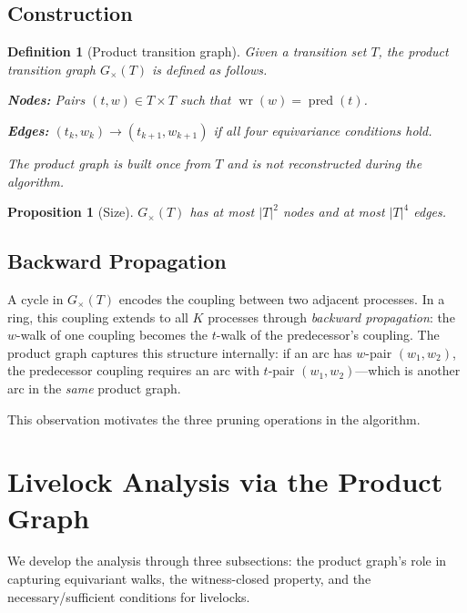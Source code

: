 \documentclass[11pt]{article}
\newtheorem{proposition}[theorem]{Proposition}
\newtheorem{definition}{Definition}
\begin{document}
\subsection{Construction}

\begin{definition}[Product transition graph]
\label{def:product}
Given a transition set $T$, the \emph{product transition graph} $G_\times(T)$ is defined as follows.

\textbf{Nodes:} Pairs $(t, w) \in T \times T$ such that $\operatorname{wr}(w) = \operatorname{pred}(t)$.

\textbf{Edges:} $(t_k, w_k) \to (t_{k+1}, w_{k+1})$ if all four equivariance conditions hold.

The product graph is built \emph{once} from $T$ and is not reconstructed during the algorithm.
\end{definition}

\begin{proposition}[Size]
$G_\times(T)$ has at most $|T|^2$ nodes and at most $|T|^4$ edges.
\end{proposition}

\subsection{Backward Propagation}

A cycle in $G_\times(T)$ encodes the coupling between two adjacent processes. In a ring, this coupling extends to all $K$ processes through \emph{backward propagation}: the $w$-walk of one coupling becomes the $t$-walk of the predecessor's coupling. The product graph captures this structure internally: if an arc has $w$-pair $(w_1, w_2)$, the predecessor coupling requires an arc with $t$-pair $(w_1, w_2)$---which is another arc in the \emph{same} product graph.

This observation motivates the three pruning operations in the algorithm.

\section{Livelock Analysis via the Product Graph}
\label{sec:bounded}

We develop the analysis through three subsections: the product graph's role in capturing equivariant walks, the witness-closed property, and the necessary/sufficient conditions for livelocks.
\end{document}
